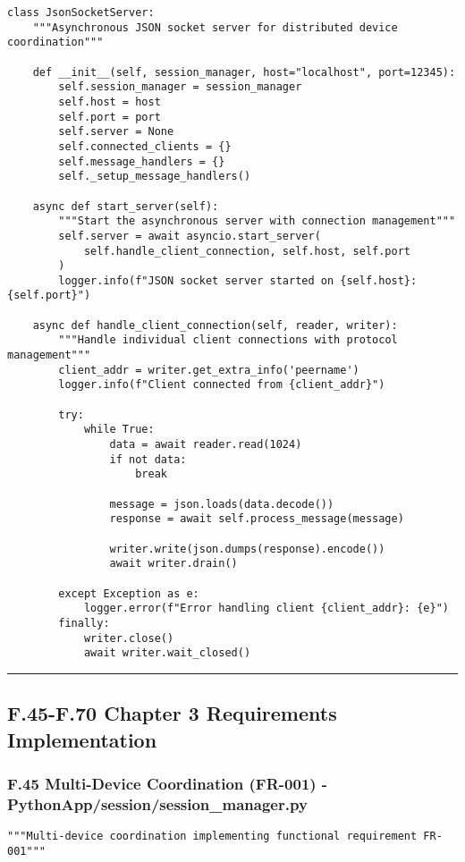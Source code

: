 \documentclass[12pt,a4paper]{report}
\begin{document}
{{\begin{verbatim}
class JsonSocketServer:
    """Asynchronous JSON socket server for distributed device coordination"""

    def __init__(self, session_manager, host="localhost", port=12345):
        self.session_manager = session_manager
        self.host = host
        self.port = port
        self.server = None
        self.connected_clients = {}
        self.message_handlers = {}
        self._setup_message_handlers()

    async def start_server(self):
        """Start the asynchronous server with connection management"""
        self.server = await asyncio.start_server(
            self.handle_client_connection, self.host, self.port
        )
        logger.info(f"JSON socket server started on {self.host}:{self.port}")

    async def handle_client_connection(self, reader, writer):
        """Handle individual client connections with protocol management"""
        client_addr = writer.get_extra_info('peername')
        logger.info(f"Client connected from {client_addr}")

        try:
            while True:
                data = await reader.read(1024)
                if not data:
                    break

                message = json.loads(data.decode())
                response = await self.process_message(message)

                writer.write(json.dumps(response).encode())
                await writer.drain()

        except Exception as e:
            logger.error(f"Error handling client {client_addr}: {e}")
        finally:
            writer.close()
            await writer.wait_closed()
\end{verbatim}

\hrule

\subsection{F.45-F.70 Chapter 3 Requirements Implementation}

\subsubsection{F.45 Multi-Device Coordination (FR-001) - PythonApp/session/session_manager.py}

\begin{verbatim}
"""Multi-device coordination implementing functional requirement FR-001"""



\end{verbatim}}}
\end{document}
